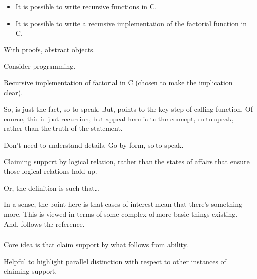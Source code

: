 \begin{note}

  \begin{illustration}\label{ill:ad:factorial}
    \begin{itemize}
    \item It is possible to write recursive functions in C.
    \item It is possible to write a recursive implementation of the factorial function in C.
    \end{itemize}
  \end{illustration}
  With proofs, abstract objects.

  Consider programming.

  Recursive implementation of factorial in C (chosen to make the implication clear).

  So, \adA{} is just the fact, so to speak.
  But, \adB{} points to the key step of calling function.
  Of course, this is just recursion, but appeal here is to the concept, so to speak, rather than the truth of the statement.

  Don't need to understand details.
  Go by form, so to speak.

  Claiming support by logical relation, rather than the states of affairs that ensure those logical relations hold up.

  Or, the definition is such that\dots
\end{note}

\begin{note}[Existentials]
  In a sense, the point here is that \adA{} cases of interest mean that there's something more.
  This is viewed in terms of some complex of more basic things existing.
  And, \adB{} follows the reference.
\end{note}

\subsubsection{\adA{}}
\label{sec:ads}

\subsubsection{\adB{}}
\label{sec:adc}

\begin{note}
  Core idea is that claim support by what follows from ability.

  Helpful to highlight parallel distinction with respect to other instances of claiming support.
\end{note}

